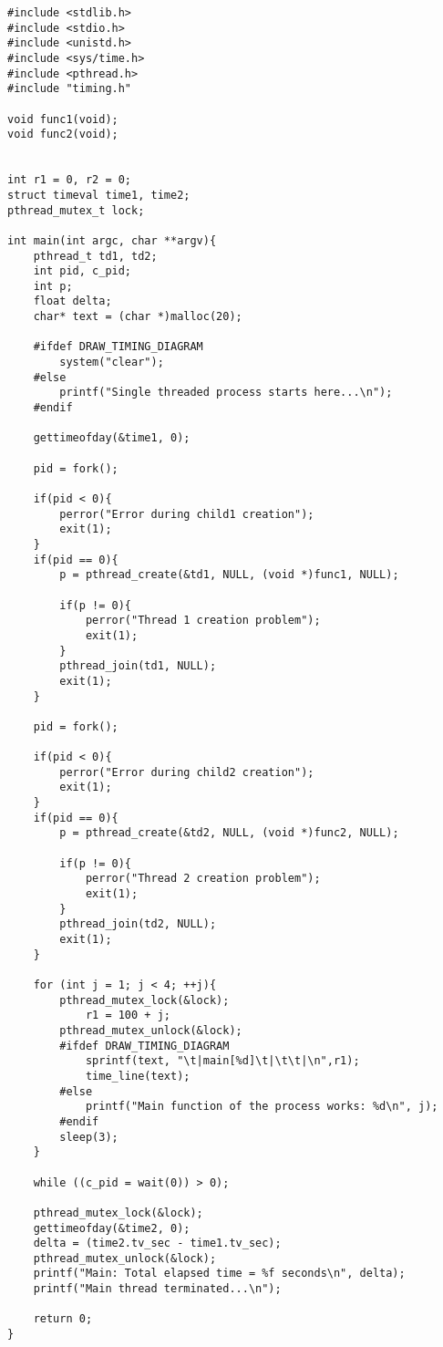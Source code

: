 \documentclass[11pt]{article}
\begin{document}
\begin{minipage}{1\textwidth}
\begin{lstlisting}[title=multiprocess.c, frame=tlrb, basicstyle=\tiny]
#include <stdlib.h>
#include <stdio.h>
#include <unistd.h>
#include <sys/time.h>
#include <pthread.h>
#include "timing.h"

void func1(void);
void func2(void);


int r1 = 0, r2 = 0;
struct timeval time1, time2;
pthread_mutex_t lock;

int main(int argc, char **argv){
	pthread_t td1, td2;
	int pid, c_pid;
	int p;
	float delta;
	char* text = (char *)malloc(20);

	#ifdef DRAW_TIMING_DIAGRAM
		system("clear");
	#else
		printf("Single threaded process starts here...\n");
	#endif

	gettimeofday(&time1, 0);
	
	pid = fork();

	if(pid < 0){
		perror("Error during child1 creation");
		exit(1);
	}
	if(pid == 0){
		p = pthread_create(&td1, NULL, (void *)func1, NULL);
		
		if(p != 0){
			perror("Thread 1 creation problem");
			exit(1);
		}
		pthread_join(td1, NULL);
		exit(1);
	}

	pid = fork();

	if(pid < 0){
		perror("Error during child2 creation");
		exit(1);
	}
	if(pid == 0){
		p = pthread_create(&td2, NULL, (void *)func2, NULL);

		if(p != 0){
			perror("Thread 2 creation problem");
			exit(1);
		}
		pthread_join(td2, NULL);
		exit(1);
	}

	for (int j = 1; j < 4; ++j){
		pthread_mutex_lock(&lock);
			r1 = 100 + j;
		pthread_mutex_unlock(&lock);
		#ifdef DRAW_TIMING_DIAGRAM
			sprintf(text, "\t|main[%d]\t|\t\t|\n",r1);
			time_line(text);
		#else
			printf("Main function of the process works: %d\n", j);
		#endif
		sleep(3);
	}

	while ((c_pid = wait(0)) > 0);

	pthread_mutex_lock(&lock);
	gettimeofday(&time2, 0);
	delta = (time2.tv_sec - time1.tv_sec);
	pthread_mutex_unlock(&lock);
	printf("Main: Total elapsed time = %f seconds\n", delta);
	printf("Main thread terminated...\n");

	return 0;
}
\end{lstlisting}
\end{minipage}
\end{document}
